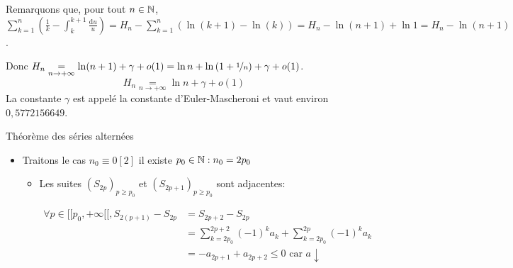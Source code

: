 \documentclass{article}
\renewenvironment{question_kholle}[2][ ]
{
	\subsection{\texorpdfstring{#2}{}}
	\notblank{#1}
	{
		\noindent #1
		\bigbreak
	}
	{}
	\begin{proof}
}
{
	\end{proof}
}
\begin{document}
\begin{question_kholle}
  Remarquons que, pour tout $n \in \mathbb N$,
  $\displaystyle \sum_{k=1}^{n} \left( \frac{1}{k} - \int_{k}^{k+1} \frac{\mathrm du}{u} \right)
    = H_n - \sum_{k=1}^{n} \left( \ln(k+1) - \ln(k) \right)
    = H_n - \ln(n+1) + \ln 1
    = H_n - \ln(n+1)$.

  Donc $H_n \underset{n \to +\infty}{=} \ln(n+1) + \gamma + o(1) = \ln n + \ln \left( 1 + \nicefrac{1}{n} \right) + \gamma + o(1)$.
  \begin{equation*}
    H_n \underset{n \to +\infty}{=} \ln n + \gamma + o(1)
  \end{equation*}
  La constante $\gamma$ est appelé la constante d'Euler-Mascheroni et vaut environ $0,5772156649$.
\end{question_kholle}

\begin{question_kholle}[{Soit $(a_{n})_{n\geqslant n_{0}} \in \R^{[ \! [ n_{0}, +\infty [ \![}$ une suite réelle.
  Si
  $$
    \left\{ \begin{array}{ll}
      \forall n \in [ \! [ n_{0}, +\infty [\![, a_{n} \geqslant 0 \\
      (a_{n})_{n\geqslant n_{0}} \text{ est décroissante}         \\
      \lim_{ n \to \infty } a_{n}=0
    \end{array}\right.
  $$
  alors $\sum_{n\geqslant n_{0}}(-1)^{n}a_{n}$}]{Théorème des séries alternées}

  \begin{itemize}[label=$\lozenge$]
    \item Traitons le cas $n_{0}\equiv 0 [2]$ il existe $p_{0} \in \mathbb N: n_{0}=2p_{0}$
          \begin{itemize}[label=$\star$]
            \item  Les suites $(S_{2p})_{p\geqslant p_{0}}$ et $(S_{2p+1})_{p\geqslant p_{0}}$ sont adjacentes:

                  \begin{align*}
                    \forall p \in [ \! [ p_{0}, +\infty[ \![, S_{2(p+1)} - S_{2p} & = S_{2p+2}- S_{2p}                                                        \\
                                                                                  & = \sum_{k=2p_{0}}^{2p+2}(-1)^{k}a_{k} + \sum_{k=2p_{0}}^{2p}(-1)^{k}a_{k} \\
                                                                                  & = -a_{2p+1}+a_{2p+2} \leqslant 0 \text{ car }a\downarrow
                  \end{align*}


\end{itemize}
\end{itemize}
\end{question_kholle}
\end{document}
